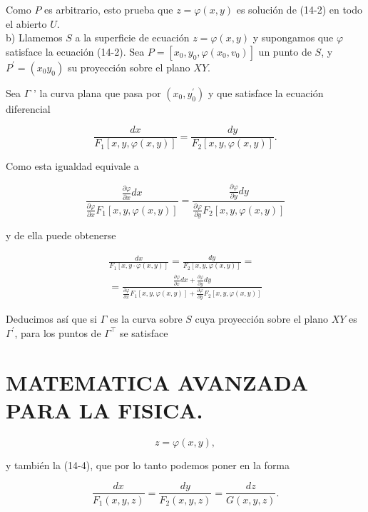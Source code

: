 \documentclass[10pt]{article}
\theoremstyle{plain}
\theoremstyle{definition}
\theoremstyle{remark}
\begin{document}
Como $P$ es arbitrario, esto prueba que $z=\varphi(x, y)$ es solución de (14-2) en todo el abierto $U$.\\
b) Llamemos $S$ a la superficie de ecuación $z=\varphi(x, y)$ y supongamos que $\varphi$ satisface la ecuación (14-2). Sea $P=\left[x_{0}, y_{0}, \varphi\left(x_{0}, v_{0}\right)\right]$ un punto de $S$, y $P^{\prime}=\left(x_{0} y_{0}\right)$ su proyección sobre el plano $X Y$.

Sea $\Gamma$ ' la curva plana que pasa por $\left(x_{0}, y_{0}^{\prime}\right)$ y que satisface la ecuación diferencial


\begin{equation*}
\frac{d x}{F_{1}[x, y, \varphi(x, y)]}=\frac{d y}{F_{2}[x, y, \varphi(x, y)]} . \tag{14-3}
\end{equation*}


Como esta igualdad equivale a

$$
\frac{\frac{\partial \varphi}{\partial x} d x}{\frac{\partial \varphi}{\partial x} F_{1}[x, y, \varphi(x, y)]}=\frac{\frac{\partial \varphi}{\partial y} d y}{\frac{\partial \varphi}{\partial y} F_{2}[x, y, \varphi(x, y)]}
$$

y de ella puede obtenerse


\begin{gather*}
\frac{d x}{F_{1}[x, y \cdot \varphi(x, y)]}=\frac{d y}{F_{2}[x, y, \varphi(x, y)]}= \\
=\frac{\frac{\partial \varphi}{\partial x} d x+\frac{\partial \varphi}{\partial y} d y}{\frac{\partial \varphi}{\partial x} F_{1}[x, y, \varphi(x, y)]+\frac{\partial \varphi}{\partial y} F_{2}[x, y, \varphi(x, y)]} \tag{14-4}
\end{gather*}


Deducimos así que si $\Gamma$ es la curva sobre $S$ cuya proyección sobre el plano $X Y$ es $\Gamma^{\prime}$, para los puntos de $\Gamma^{\top}$ se satisface

\section*{MATEMATICA AVANZADA PARA LA FISICA.}
$$
z=\varphi(x, y),
$$

y también la (14-4), que por lo tanto podemos poner en la forma


\begin{equation*}
\frac{d x}{F_{1}(x, y, z)}=\frac{d y}{F_{2}(x, y, z)}=\frac{d z}{G(x, y, z)} . \tag{14.5}
\end{equation*}
\end{document}

